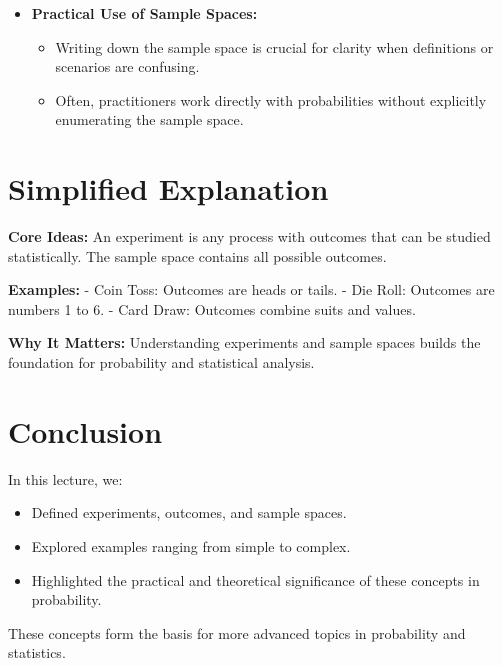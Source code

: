 \documentclass{article}
\begin{document}
\begin{itemize}
  \item \textbf{Practical Use of Sample Spaces:}
    \begin{itemize}
      \item Writing down the sample space is crucial for clarity when definitions or scenarios are confusing.
      \item Often, practitioners work directly with probabilities without explicitly enumerating the sample space.
    \end{itemize}
\end{itemize}

\section*{Simplified Explanation}

\textbf{Core Ideas:}
An experiment is any process with outcomes that can be studied statistically. The sample space contains all possible outcomes.

\textbf{Examples:}
- Coin Toss: Outcomes are heads or tails.
- Die Roll: Outcomes are numbers 1 to 6.
- Card Draw: Outcomes combine suits and values.

\textbf{Why It Matters:}
Understanding experiments and sample spaces builds the foundation for probability and statistical analysis.

\section*{Conclusion}

In this lecture, we:
\begin{itemize}
  \item Defined experiments, outcomes, and sample spaces.
  \item Explored examples ranging from simple to complex.
  \item Highlighted the practical and theoretical significance of these concepts in probability.
\end{itemize}

These concepts form the basis for more advanced topics in probability and statistics.
\end{document}
